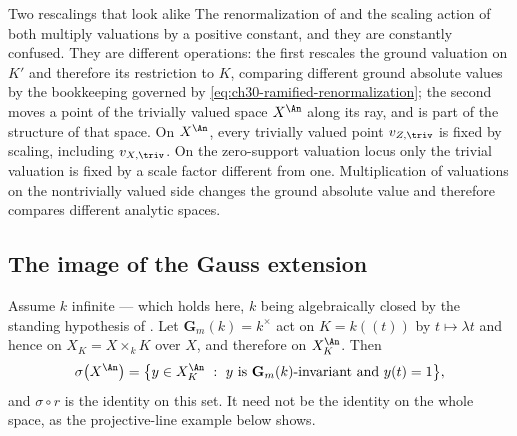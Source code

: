 \newpage
\begin{warning}{Two rescalings that look alike}
The renormalization of  and the scaling
action of  both multiply valuations by a
positive constant, and they are constantly confused.  They are different
operations: the first rescales the ground valuation on $K'$ and
therefore its restriction to $K$, comparing different ground absolute
values by the bookkeeping
governed by \eqref{eq:ch30-ramified-renormalization}; the second moves a
point of the trivially valued space $X^{\An}$ along its ray, and is part
of the structure of that space.  On $X^{\An}$, every trivially valued point
$v_{Z,\triv}$ is fixed by scaling, including $v_{X,\triv}$.
On the zero-support valuation locus only the trivial valuation is fixed
by a scale factor different from one.  Multiplication of valuations on
the nontrivially valued side changes the ground absolute value and
therefore compares different analytic spaces.
\end{warning}

\subsection{The image of the Gauss extension}
\label{sec:ch30-gauss-image}

\begin{theorem}
\label{thm:ch30-gauss-image}
Assume $k$ infinite --- which holds here, $k$ being algebraically
closed by the standing hypothesis of .  Let
$\mathbf G_m(k)=k^\times$ act on $K=k(\!(t)\!)$ by $t\mapsto\lambda t$
and hence on $X_K=X\times_kK$ over $X$, and therefore on
$X_K^{\An}$.  Then
\begin{equation}
\label{eq:ch30-gauss-image}
 \sigma\bigl(X^{\An}\bigr)
 =\bigl\{y\in X_K^{\An}\ :\ y\ \text{is}\ \mathbf G_m(k)\text{-invariant
   and}\ y(t)=1\bigr\},
\end{equation}
and $\sigma\circ r$ is the identity on this set.  It need not be the
identity on the whole space, as the projective-line example below shows.
\end{theorem}

